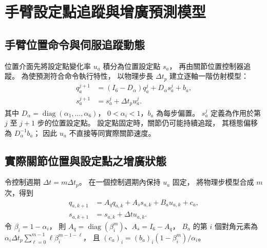 \section{手臂設定點追蹤與增廣預測模型}
\label{sec:arm_augmented_prediction}

\subsection{手臂位置命令與伺服追蹤動態}
\label{subsec:arm_setpoint_servo}

位置介面先將設定點變化率 $u_a$ 積分為位置設定點 $s_a$，
再由關節位置控制器追蹤。
為使預測符合命令執行特性\cite{grandia2019frequency}，
以物理步長 $\Delta t_p$ 建立逐軸一階仿射模型：
\begin{equation}
    \begin{aligned}
        q_a^{j+1}&=(I_6-D_\alpha)q_a^j+D_\alpha s_a^j+b_a,\\
        s_a^{j+1}&=s_a^j+\Delta t_p u_a^j .
    \end{aligned}
    \label{eq:ch3_physics_step_arm_model}
\end{equation}
其中 $D_\alpha=\operatorname{diag}(\alpha_1,\ldots,\alpha_6)$，
$0<\alpha_i<1$，$b_a$ 為每步偏置。
$s_a^j$ 定義為作用於第 $j$ 至 $j+1$ 步的位置設定點。
設定點固定時，關節仍可能持續追蹤，
其穩態偏移為 $D_\alpha^{-1}b_a$；
因此 $u_a$ 不直接等同實際關節速度。

\subsection{實際關節位置與設定點之增廣狀態}
\label{subsec:augmented_arm_state}

令控制週期 $\Delta t=m\Delta t_p$。
在一個控制週期內保持 $u_a$ 固定，
將物理步模型合成 $m$ 次，得到
\begin{equation}
    \begin{aligned}
        q_{a,k+1}&=A_q q_{a,k}+A_s s_{a,k}+B_a u_{a,k}+c_a,\\
        s_{a,k+1}&=s_{a,k}+\Delta t u_{a,k}.
    \end{aligned}
    \label{eq:ch3_control_step_arm_model}
\end{equation}
令 $\beta_i=1-\alpha_i$，
則 $A_q=\operatorname{diag}(\beta_i^m)$、$A_s=I_6-A_q$，
$B_a$ 的第 $i$ 個對角元素為
$\alpha_i\Delta t_p\sum_{\ell=0}^{m-1}\ell\beta_i^{m-1-\ell}$，
且 $(c_a)_i=(b_a)_i(1-\beta_i^m)/\alpha_i$。


